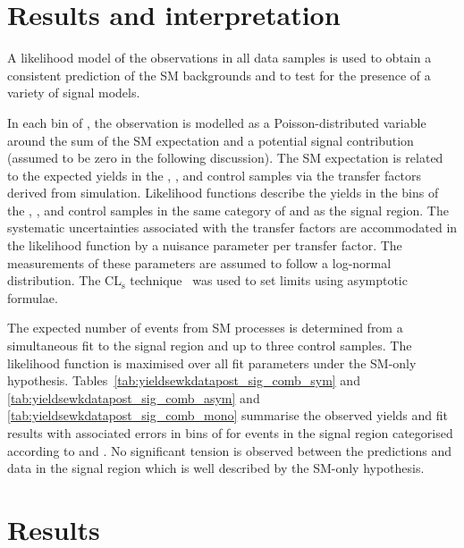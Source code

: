 \section{Results and interpretation}
\label{sec:interpretation}

A likelihood model of the observations in all data samples is
used to obtain a consistent prediction of the SM backgrounds and to
test for the presence of a variety of signal models.

In each bin of \scalht, the observation is modelled as a
Poisson-distributed variable around the sum of the SM expectation and a
potential signal contribution (assumed to be zero in the following
discussion). The SM expectation is related to the expected yields in
the \mj, \mmj, and \gj control samples via the transfer factors
derived from simulation. Likelihood functions describe the yields in the \scalht bins
of the \mj, \mmj, and \gj control samples in the same category of
\njet and \nb as the signal region. The systematic uncertainties
associated with the transfer factors are accommodated in the
likelihood function by a nuisance parameter per transfer factor. The
measurements of these parameters are assumed to follow a log-normal
distribution. The CL$_{\mathrm{s}}$ technique~\cite{read, Cowan:2010js} was used to set limits using asymptotic formulae.

The expected number of events from SM processes is determined from a
simultaneous fit to the signal region and up to three control
samples. The likelihood function is maximised over all fit parameters
under the SM-only hypothesis.
Tables~\ref{tab:yieldsewkdatapost_sig_comb_sym} and \ref{tab:yieldsewkdatapost_sig_comb_asym} and
\ref{tab:yieldsewkdatapost_sig_comb_mono} summarise
the observed yields and fit results with associated errors in bins of \scalht for events in the signal region
categorised according to \njet and \nb. 
No significant tension is observed between the predictions and data in the
signal region which is well described by the SM-only hypothesis.




\clearpage


\section{Results} \label{sec:darkmatter}

